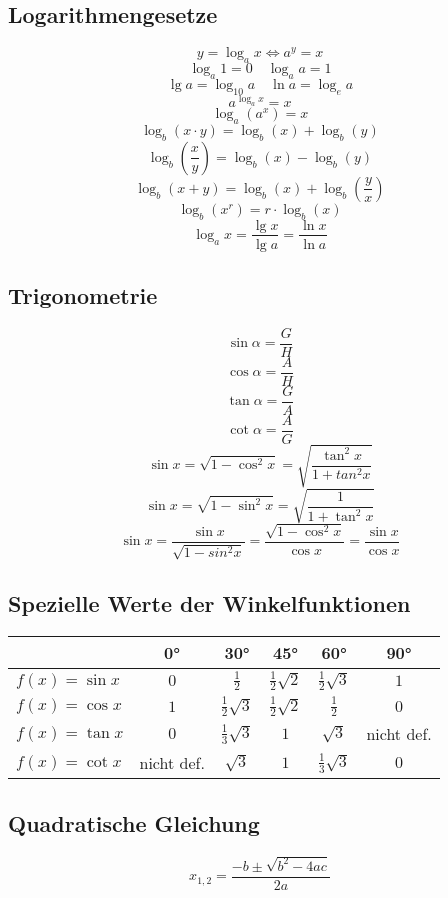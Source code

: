 \subsection{Logarithmengesetze}
\[ \boxed{y=\log_ax \Leftrightarrow a^y=x} \]
\[ \boxed{\log_a1=0 \quad \log_aa=1} \]
\[ \boxed{\lg a=\log_{10}a \quad \ln a = \log_ea} \]
\[ \boxed{a^{\log_ax}=x} \]
\[ \boxed{\log_a\left(a^x\right)=x} \]
\[ \boxed{\log_b(x \cdot y) = \log_b(x) + \log_b(y)} \]
\[ \boxed{\log_b \left( \frac{x}{y} \right) = \log_b(x) - \log_b(y)} \]
\[ \boxed{\log_b(x + y) = \log_b(x) + \log_b\left(\frac{y}{x}\right)} \]
\[ \boxed{\log_b(x^r) = r \cdot \log_b(x)} \]
\[ \boxed{\log_ax=\frac{\lg x}{\lg a}=\frac{\ln x}{\ln a}} \]

\subsection{Trigonometrie}
\[ \boxed{\sin\alpha=\frac{G}{H}} \]
\[ \boxed{\cos\alpha=\frac{A}{H}} \]
\[ \boxed{\tan\alpha=\frac{G}{A}} \]
\[ \boxed{\cot\alpha=\frac{A}{G}} \]
\[ \boxed{\sin x = \sqrt{1-\cos^2x} = \sqrt{\frac{\tan^2x}{1+tan^2x}}} \]
\[ \boxed{\sin x = \sqrt{1-\sin^2x} = \sqrt{\frac{1}{1+\tan^2x}}} \]
\[ \boxed{\sin x = \frac{\sin x}{\sqrt{1-sin^2x}} = \frac{\sqrt{1-\cos^2x}}{\cos x} = \frac{\sin x}{\cos x}} \]

\subsection{Spezielle Werte der Winkelfunktionen}
\begin{tabular}{|l|c|c|c|c|c|}
\hline              & 0° & 30° & 45° & 60° & 90° \\
\hline $f(x)=\sin x$ & $0$ & $\frac{1}{2}$ & $\frac{1}{2}\sqrt{2}$ & $\frac{1}{2}\sqrt{3}$ & $1$ \\
\hline $f(x)=\cos x$ & $1$ & $\frac{1}{2}\sqrt{3}$ & $\frac{1}{2}\sqrt{2}$ & $\frac{1}{2}$ & $0$ \\
\hline $f(x)=\tan x$ & $0$ & $\frac{1}{3}\sqrt{3}$ & $1$ & $\sqrt{3}$ & nicht def. \\
\hline $f(x)=\cot x$ & nicht def. & $\sqrt{3}$ & $1$ & $\frac{1}{3}\sqrt{3}$ & $0$ \\
\hline \end{tabular}

\subsection{Quadratische Gleichung}
\[ \boxed{x_{1,2}=\frac{-b\pm\sqrt{b^2-4ac}}{2a}} \]
